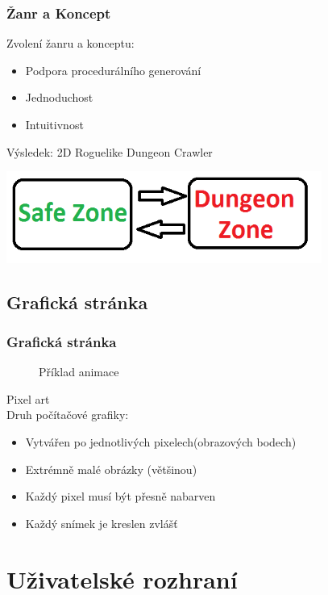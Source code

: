 \documentclass{beamer}
\begin{document}
\begin{frame}
	\frametitle{Žanr a Koncept}
	Zvolení žanru a konceptu:
	\begin{itemize}
 		\item Podpora procedurálního generování
		\item Jednoduchost
 		\item Intuitivnost
	\end{itemize}
	\pause
	Výsledek: 2D Roguelike Dungeon Crawler
	\begin{center}
		\includegraphics[height=3cm]{game-concept.png}	
	\end{center}
\end{frame}

	\subsection{Grafická stránka}
	
\begin{frame}
	\frametitle{Grafická stránka}	
	
	\begin{minipage}{0.45\linewidth}
		\begin{figure}
    		\caption{Příklad animace}		
		\end{figure}    	
	\end{minipage}\hfil
	\begin{minipage}{0.55\linewidth}
	Pixel art \\Druh počítačové grafiky:
	\begin{itemize}
 		\item Vytvářen po jednotlivých pixelech(obrazových bodech)
		\item Extrémně malé obrázky (většinou)
 		\item Každý pixel musí být přesně nabarven
 		\item Každý snímek je kreslen zvlášť
	\end{itemize}
	\end{minipage}
\end{frame}


\section{Uživatelské rozhraní}
\end{document}
